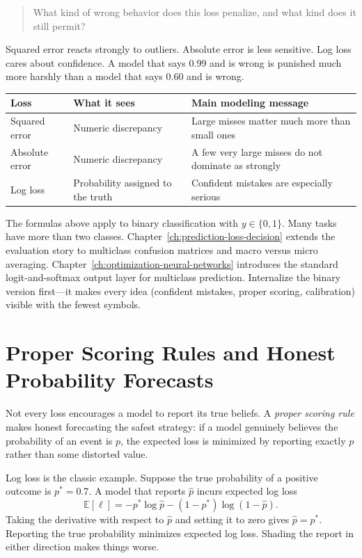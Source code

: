 \begin{quote}
What kind of wrong behavior does this loss penalize, and what kind does it still permit?
\end{quote}

Squared error reacts strongly to outliers. Absolute error is less sensitive. Log loss cares about confidence. A model that says \(0.99\) and is wrong is punished much more harshly than a model that says \(0.60\) and is wrong.

\begin{center}
\small
\begin{tabular}{p{2.3cm}p{2.77cm}p{4.46cm}}
\toprule
Loss & What it sees & Main modeling message \\
\midrule
Squared error & Numeric discrepancy & Large misses matter much more than small ones \\
Absolute error & Numeric discrepancy & A few very large misses do not dominate as strongly \\
Log loss & Probability assigned to the truth & Confident mistakes are especially serious \\
\bottomrule
\end{tabular}
\end{center}

The formulas above apply to binary classification with $y \in \{0,1\}$. Many tasks have more than two classes. Chapter~\ref{ch:prediction-loss-decision} extends the evaluation story to multiclass confusion matrices and macro versus micro averaging. Chapter~\ref{ch:optimization-neural-networks} introduces the standard logit-and-softmax output layer for multiclass prediction. Internalize the binary version first---it makes every idea (confident mistakes, proper scoring, calibration) visible with the fewest symbols.

\section*{Proper Scoring Rules and Honest Probability Forecasts}

Not every loss encourages a model to report its true beliefs. A \emph{proper scoring rule} makes honest forecasting the safest strategy: if a model genuinely believes the probability of an event is $p$, the expected loss is minimized by reporting exactly $p$ rather than some distorted value.

Log loss is the classic example. Suppose the true probability of a positive outcome is $p^* = 0.7$. A model that reports $\hat{p}$ incurs expected log loss
\[
\mathbb{E}[\ell] = -p^* \log \hat{p} - (1-p^*) \log(1-\hat{p}).
\]
Taking the derivative with respect to $\hat{p}$ and setting it to zero gives $\hat{p} = p^*$. Reporting the true probability minimizes expected log loss. Shading the report in either direction makes things worse.

